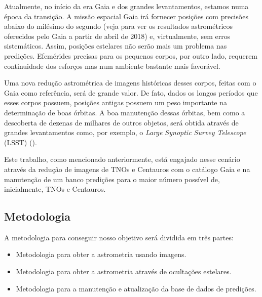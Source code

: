 \documentclass[a4paper, 11pt]{article}
\begin{document}
Atualmente, no início da era Gaia e dos grandes levantamentos, estamos numa época da transição. A missão espacial Gaia irá fornecer posições com precisões abaixo do milésimo do segundo (veja \citet{2017arXiv171010816K} para ver os resultados astrométricos oferecidos pelo Gaia a partir de abril de 2018) e, virtualmente, sem erros sistemáticos. Assim, posições estelares não serão mais um problema nas predições. Efemérides precisas para os pequenos corpos, por outro lado, requerem continuidade dos esforços mas num ambiente bastante mais favorável.   
% 
% 
% 

Uma nova redução astrométrica de imagens históricas desses corpos, feitas com o Gaia como referência, será de grande valor. De fato, dados os longos períodos que esses corpos possuem, posições antigas possuem um peso importante na determinação de boas órbitas. A boa manutenção dessas órbitas, bem como a descoberta de dezenas de milhares de outros objetos, será obtida através de grandes levantamentos como, por exemplo, o {\it Large Synoptic Survey Telescope} (LSST) (\citet{2009arXiv0912.0201L}).

Este trabalho, como mencionado anteriormente, está engajado nesse cenário através da redução de imagens de TNOs e Centauros com o catálogo Gaia e na manutenção de um banco predições para o maior número possível de, inicialmente, TNOs e Centauros.

\newpage
\subsection{Metodologia}

A metodologia para conseguir nosso objetivo será dividida em três partes:
% 
% 

\begin{itemize}
  \item Metodologia para obter a astrometria usando imagens.
  \item Metodologia para obter a astrometria através de ocultações estelares.
  \item Metodologia para a manuten\c c\~ao e atualiza\c c\~ao da base de dados de predi\c c\~oes.
\end{itemize}
\end{document}
